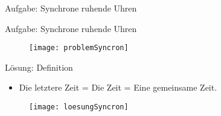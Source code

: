 \documentclass[]{beamer}%
\newcommand{\drawBasis}[5]{%
    \tikzmath{  \sLW=#2;}
    \draw[line width=1pt*\sLW,->] (0,0,0) -- (1,0,0) node[scale=#1, anchor=north east]{$#3$};
    \draw[line width=1pt*\sLW,->] (0,0,0) -- (0,1,0) node[scale=#1, anchor=south]{$#4$};
    \draw[line width=1pt*\sLW,->] (0,0,0) -- (0,0,1) node[scale=#1, anchor=south]{$#5$};
}
\newcommand{\clock}[6]{%
    \begin{scope}[xshift=#1, yshift=#2, scale=#3, line cap=round]
        \tikzmath{
            \sLW = #4;  %
        } 
        \draw [line width=1.6pt*\sLW] (0,0) circle (1.15cm);
        \foreach \angle in {0, 30, ..., 330} 
            \draw[line width=1pt*\sLW] (\angle:0.89cm) -- (\angle:1cm);
        \foreach \angle in {0,90,180,270}
            \draw[line width=1.4pt*\sLW] (\angle:0.82cm) -- (\angle:1cm);
        \draw[line width=1.6pt*\sLW] (0,0) -- (90-30*#5:0.4cm); %
        \draw[line width=1.3pt*\sLW] (0,0) -- (90-6*#6:0.65cm); %
    \end{scope}
}
\newcommand{\guy}[4]{%
    \begin{scope}[xshift=#1,yshift=#2,scale=#3]
        \tikzmath{
            \sLW = #4;  %
        } 
        \draw[line width=2pt*\sLW] (0,0) circle (1cm);               %
        \draw[fill=black] (35:0.3cm) circle (0.08cm*\sLW);           %
        \draw[fill=black] (145:0.3cm) circle (0.08cm*\sLW);          %
        \draw[line width=2pt*\sLW] ([shift={+(0cm,0cm)}]245:0.5cm) arc (245:295:0.5cm);
        
        \draw[line width=2pt*\sLW] (0,-1cm) -- ++(-90:2.25cm);       %
        \draw[line width=2pt*\sLW] (0,-2cm) -- ++(30:1.5cm);         %
        \draw[line width=2pt*\sLW] (0,-2cm) -- ++(150:1.5cm);        %
        \draw[line width=2pt*\sLW] (0,-3.25cm) -- ++(-60:1.5cm);     %
        \draw[line width=2pt*\sLW] (0,-3.25cm) -- ++(240:1.5cm);     %
    \end{scope}
}
\newcommand{\spaceTime}[9]{%
    \begin{scope}[xshift=#1, yshift=#2, scale=#3]
        \tdplotsetmaincoords{55}{30}
        \begin{scope}[scale=1, tdplot_main_coords]
            \drawBasis{#5}{#4}{#6}{#7}{#8}
            \begin{scope}[scale=2]
                \clock{0.43cm}{0.1cm}{0.15}{0.8*#4}{9}{5};
                \begin{scope}[xshift=0.7cm, yshift=0]    
                    \node[scale=#5](0,0){$#9$};
                \end{scope}
            \end{scope}
        \end{scope}
        \tdplotsetmaincoords{0}{0}
    \end{scope}
}
\begin{document}
\begin{frame}{Aufgabe: Synchrone ruhende Uhren}
    \begin{figure}[h]
        \centering
    \end{figure}        
\end{frame}

\begin{frame}{Aufgabe: Synchrone ruhende Uhren}
    \begin{figure}[h]
            \centering
            \texttt{[image: problemSyncron]}
            \caption{\cite{Einstein1905}}
    \end{figure}
\end{frame}

\begin{frame}{Lösung: Definition}
    \begin{itemize}
        \item Die letztere Zeit = Die Zeit = Eine gemeinsame Zeit. 
    \end{itemize}
    \begin{figure}[h]
            \centering
            \texttt{[image: loesungSyncron]}
            \caption{\cite{Einstein1905}}
    \end{figure}
\end{frame}
\end{document}
